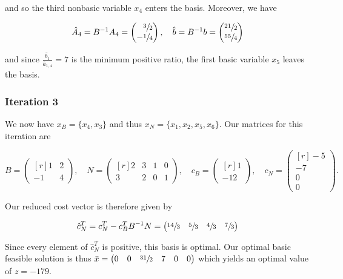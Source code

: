 \begin{solution}
  and so the third nonbasic variable $x_4$ enters the basis. Moreover, we have
  
  $$
  \hat{A}_4 = B^{-1} A_4 = \begin{pmatrix*}[r]
    \sfrac{3}{2}  \\
   -\sfrac{1}{4}
  \end{pmatrix*}, \quad \hat{b} = B^{-1} b = \begin{pmatrix*}[r]
    \sfrac{21}{2}  \\
    \sfrac{55}{4}
  \end{pmatrix*}
  $$

  and since $\frac{\hat{b}_1}{\hat{a}_{1,4}} = 7$ is the minimum positive ratio, the first basic variable $x_5$ leaves 
  the basis.

  \subsubsection*{Iteration 3}
  We now have $x_B = \{x_4, x_3\}$ and thus $x_N = \{x_1, x_2, x_5, x_6\}$. Our matrices for this iteration are

  $$
    B = \begin{pmatrix*}[r]
      1 & 2 \\
     -1 & 4
    \end{pmatrix*}, \quad N = \begin{pmatrix*}[r]
      2 & 3 &  1 & 0 \\
      3 & 2 &  0 & 1
    \end{pmatrix*}, \quad c_B = \begin{pmatrix*}[r]
      1 \\
     -12
    \end{pmatrix*}, \quad c_N = \begin{pmatrix*}[r]
     -5  \\
     -7  \\
      0  \\
      0
    \end{pmatrix*}.
  $$

  Our reduced cost vector is therefore given by 

  $$
  \hat{c}_N^T = c_N^T - c_B^T B^{-1} N = \begin{pmatrix*}[r]
     \sfrac{14}{3} & \sfrac{5}{3} & \sfrac{4}{3} & \sfrac{7}{3}
  \end{pmatrix*}
  $$

  Since every element of $\hat{c}_N^T$ is positive, this basis is optimal. Our optimal basic feasible solution is thus
  $\bar{x} = \begin{pmatrix*}[r]
    0 & 0 & \sfrac{31}{2} & 7 & 0 & 0
  \end{pmatrix*}$ which yields an optimal value of $z = -179$.
  \ \\
\end{solution}